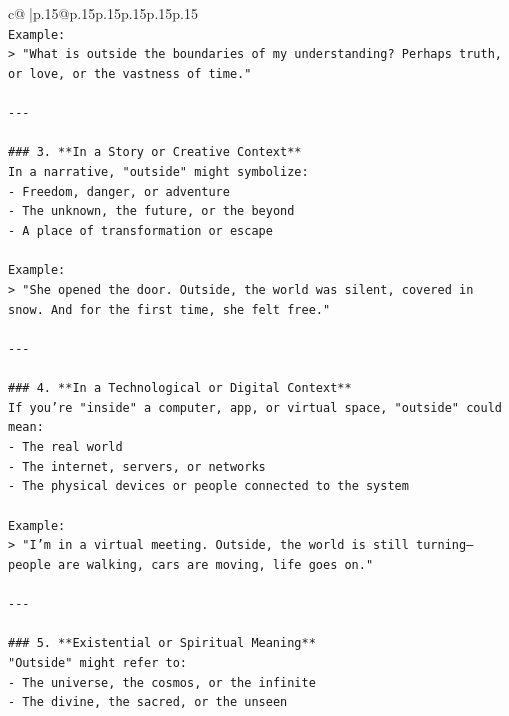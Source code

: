 \documentclass{article}
\begin{document}
{\begin{supertabular}{c@{$\;$}|p{.15\linewidth}@{}p{.15\linewidth}p{.15\linewidth}p{.15\linewidth}p{.15\linewidth}p{.15\linewidth}}
{{{\\ 
\texttt{Example:  } \\
\texttt{> "What is outside the boundaries of my understanding? Perhaps truth, or love, or the vastness of time."} \\
\\ 
\texttt{{-}{-}{-}} \\
\\ 
\texttt{\#\#\# 3. **In a Story or Creative Context**} \\
\texttt{In a narrative, "outside" might symbolize:} \\
\texttt{{-} Freedom, danger, or adventure  } \\
\texttt{{-} The unknown, the future, or the beyond  } \\
\texttt{{-} A place of transformation or escape} \\
\\ 
\texttt{Example:  } \\
\texttt{> "She opened the door. Outside, the world was silent, covered in snow. And for the first time, she felt free."} \\
\\ 
\texttt{{-}{-}{-}} \\
\\ 
\texttt{\#\#\# 4. **In a Technological or Digital Context**} \\
\texttt{If you're "inside" a computer, app, or virtual space, "outside" could mean:} \\
\texttt{{-} The real world  } \\
\texttt{{-} The internet, servers, or networks  } \\
\texttt{{-} The physical devices or people connected to the system} \\
\\ 
\texttt{Example:  } \\
\texttt{> "I'm in a virtual meeting. Outside, the world is still turning—people are walking, cars are moving, life goes on."} \\
\\ 
\texttt{{-}{-}{-}} \\
\\ 
\texttt{\#\#\# 5. **Existential or Spiritual Meaning**} \\
\texttt{"Outside" might refer to:} \\
\texttt{{-} The universe, the cosmos, or the infinite  } \\
\texttt{{-} The divine, the sacred, or the unseen  } \\
}}}
\end{supertabular}}
\end{document}
